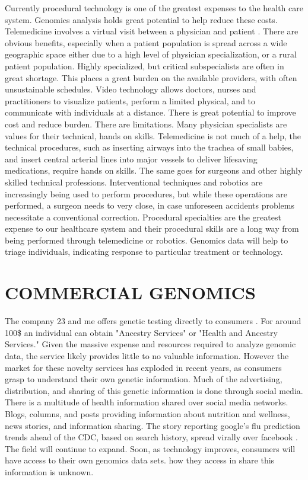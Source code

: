 \documentclass[sigconf]{acmart}
\begin{document}
Currently procedural technology is one of the greatest expenses to the health care system.  Genomics analysis holds great potential to help reduce these costs. Telemedicine involves a virtual visit between a physician and patient
\cite{hernandez2016pediatric}.  There are obvious benefits, especially when a patient population
is spread across a wide geographic space either due to a high level of
physician specialization, or a rural patient population. Highly
specialized, but critical subspecialists are often in great shortage.
This places a great burden on the available providers, with often
unsustainable schedules.  Video technology allows doctors, nurses and
practitioners to visualize patients, perform a limited physical, and
to communicate with individuals at a distance.  There is great
potential to improve cost and reduce burden. There are limitations.
Many physician specialists are values for their technical, hands on
skills.  Telemedicine is not much of a help, the technical procedures,
such as inserting airways into the trachea of small babies, and insert
central arterial lines into major vessels to deliver lifesaving
medications, require hands on skills.  The same goes for surgeons and
other highly skilled technical professions.  Interventional techniques
and robotics are increasingly being used to perform procedures, but
while these operations are performed, a surgeon needs to very close,
in case unforeseen accidents problems necessitate a conventional
correction. Procedural specialties are the greatest expense to our
healthcare system and their procedural skills are a long way from
being performed through telemedicine or robotics.  Genomics data will help to triage individuals, indicating response to particular treatment or technology.
 
 
\section{COMMERCIAL GENOMICS}

The company 23 and me offers genetic testing directly to consumers \cite{zettler201423andme}.  For around 100\$ an individual can obtain "Ancestry Services" or "Health and Ancestry Services."  Given the massive expense and resources required to analyze genomic data, the service likely provides little to no valuable information.  However the market for these novelty services has exploded in recent years, as consumers grasp to understand their own genetic information.  Much of the advertising, distribution, and sharing of this genetic information is done through social media.  There is a multitude of health information shared
over social media networks.  Blogs, columns, and posts providing
information about nutrition and wellness, news stories, and
information sharing.  The story reporting google’s flu prediction
trends ahead of the CDC, based on search history, spread virally over
facebook \cite{ginsberg2009detecting}.   The field will continue to expand.  Soon, as technology improves, consumers will have access to their own genomics data sets.  how they access in share this information is unknown.    
\end{document}
